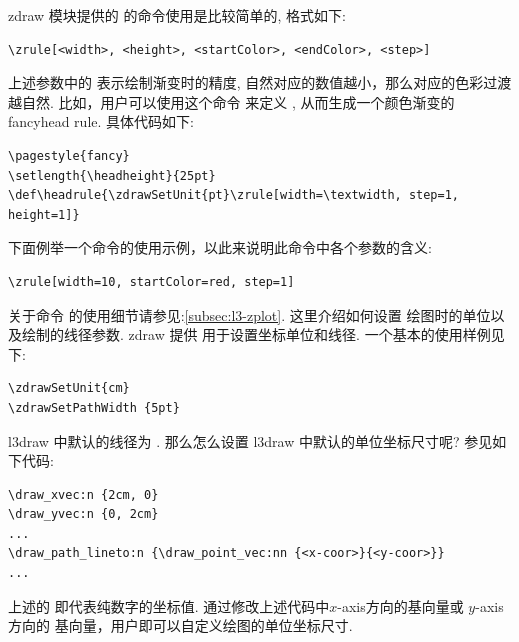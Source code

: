 zdraw 模块提供的 \cmd{\zrule} 的命令使用是比较简单的, 格式如下:
\begin{verbatim}
\zrule[<width>, <height>, <startColor>, <endColor>, <step>]
\end{verbatim}

上述参数中的  表示绘制渐变时的精度, 自然对应的数值越小，那么对应的色彩过渡越自然. 比如，用户可以使用这个命令
来定义 \cmd{\headrule}, 从而生成一个颜色渐变的fancyhead rule. 具体代码如下:

\begin{verbatim}
\pagestyle{fancy}
\setlength{\headheight}{25pt}
\def\headrule{\zdrawSetUnit{pt}\zrule[width=\textwidth, step=1, height=1]}
\end{verbatim}

下面例举一个\cmd{\zrule}命令的使用示例，以此来说明此命令中各个参数的含义:
\begin{verbatim}
\zrule[width=10, startColor=red, step=1]
\end{verbatim}

\begin{center}
\zrule[width=10, startColor=red, step=1]
\end{center}

关于命令 \cmd{\zplot} 的使用细节请参见:\cref{subsec:l3-zplot}. 这里介绍如何设置 \cmd{\zplot} 绘图时的单位以及绘制的线径参数.
zdraw 提供 \cmd{\zdrawSetUnit, \zdrawSetPathWidth} 用于设置坐标单位和线径. 一个基本的使用样例见下:

\begin{verbatim}
\zdrawSetUnit{cm}
\zdrawSetPathWidth {5pt}
\end{verbatim}

l3draw 中默认的线径为 \cmd{0.4pt}. 那么怎么设置 l3draw 中默认的单位坐标尺寸呢? 参见如下代码:
\begin{verbatim}
\draw_xvec:n {2cm, 0}
\draw_yvec:n {0, 2cm}
... 
\draw_path_lineto:n {\draw_point_vec:nn {<x-coor>}{<y-coor>}}
...
\end{verbatim}

上述的 即代表纯数字的坐标值. 通过修改上述代码中$x$-axis方向的基向量或 $y$-axis 方向的
基向量，用户即可以自定义绘图的单位坐标尺寸.


